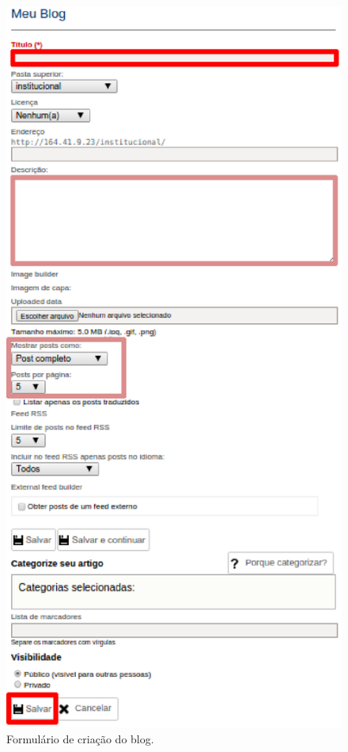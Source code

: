 \begin{figure}[H]
  \centering
    \includegraphics[keepaspectratio=true,scale=0.49]{figuras/criandoBlog.eps}
  \caption{Formulário de criação do blog.}
  \label{fig:FormCriacaoBlog}
\end{figure}

